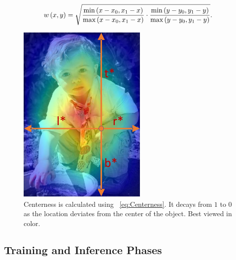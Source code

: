 \begin{equation}
    \label{eq:Centerness}
    {w} \left( x, y \right) =
    \sqrt{
        \frac{\text{min} \left( x - x_0, x_1 - x \right)}{\text{max} \left( x - x_0, x_1 - x \right)}
        \cdot
        \frac{\text{min} \left( y - y_0, y_1 - y \right)}{\text{max} \left( y - y_0, y_1 - y \right)}
    }.
\end{equation}

\begin{figure}[t]
    \centerline{\includegraphics[width=0.15\linewidth]{figures/siamese_tracking/fcos_centerness.pdf}}
    \caption[Centerness visualization]{Centerness is calculated using \eqtext{}~\ref{eq:Centerness}. It decays from $1$ to $0$ as the location deviates from the center of the object. Best viewed in color. }
    \label{fig:FCOSCenterness}
\end{figure}

\subsection{Training and Inference Phases}

